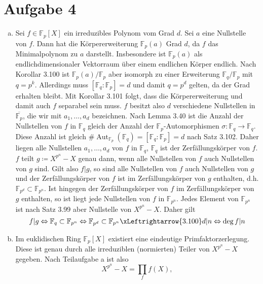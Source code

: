 \documentclass{article}
\begin{document}
    \section*{Aufgabe 4}
    \begin{enumerate}[(a)]
        \item Sei $f \in \mathbb{F}_p[X]$ ein irreduzibles Polynom vom Grad $d$. Sei $a$ eine Nullstelle von $f$. Dann hat die Körpererweiterung $\mathbb{F}_p(a)$ Grad $d$, da $f$ das Minimalpolynom zu $a$ darstellt. Insbesondere ist $\mathbb{F}_p(a)$ als endlichdimensionaler Vektorraum über einem endlichen Körper endlich. Nach Korollar 3.100 ist $\mathbb{F}_p(a)/\mathbb{F}_p$ aber isomorph zu einer Erweiterung $\mathbb{F}_{q}/\mathbb{F}_p$ mit $q = p^k$. Allerdings muss $[\mathbb{F}_q \colon \mathbb{F}_p] = d$ und damit $q = p^d$ gelten, da der Grad erhalten bleibt.
        Mit Korollar 3.101 folgt, dass die Körpererweiterung und damit auch $f$ separabel sein muss. $f$ besitzt also $d$ verschiedene Nullstellen in $\overline{\mathbb{F}_p}$, die wir mit $a_1, \dots, a_d$ bezeichnen. Nach Lemma 3.40 ist die Anzahl der Nullstellen von $f$ in $\mathbb{F}_q$ gleich der Anzahl der $\mathbb{F}_p$-Automorphismen $\sigma \colon \mathbb{F}_q \to \mathbb{F}_q$. Diese Anzahl ist gleich $\# \operatorname{Aut}_{\mathbb{F}_p}(\mathbb{F}_q) = [\mathbb{F}_q \colon \mathbb{F}_p] = d$ nach Satz 3.102. Daher liegen alle Nullstellen $a_1, \dots, a_d$ von $f$ in $\mathbb{F}_q$, $\mathbb{F}_q$ ist der Zerfällungskörper von $f$.
        $f$ teilt $g \coloneqq X^{p^n} - X$ genau dann, wenn alle Nullstellen von $f$ auch Nullstellen von $g$ sind.
        Gilt also $f|g$, so sind alle Nullstellen von $f$ auch Nullstellen von $g$ und der Zerfällungskörper von $f$ ist im Zerfällungskörper von $g$ enthalten, d.h. $\mathbb{F}_{p^d} \subset \mathbb{F}_{p^n}$. Ist hingegen der Zerfällungskörper von $f$ im Zerfällungskörper von $g$ enthalten, so ist liegt jede Nullstellen von $f$ in $\mathbb{F}_{p^n}$. Jedes Element von $\mathbb{F}_{p^n}$ ist nach Satz 3.99 aber Nullstelle von $X^{p^n} - X$. Daher gilt
        \[
            f|g \Leftrightarrow \mathbb{F}_q \subset \mathbb{F}_{p^n} \Leftrightarrow \mathbb{F}_{p^d} \subset \mathbb{F}_{p^n} \xLeftrightarrow{3.100} d | n \Leftrightarrow \deg f | n  
        \]
        \item Im euklidischen Ring $\mathbb{F}_p[X]$ existiert eine eindeutige Primfaktorzerlegung. Diese ist genau durch alle irreduziblen (normierten) Teiler von $X^{p^n} - X$ gegeben. Nach Teilaufgabe a ist also
        \[
            X^{p^n} - X = \prod_f f(X),
\]
\end{enumerate}
\end{document}
